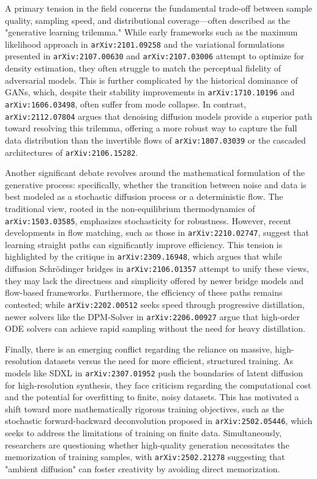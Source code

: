 \documentclass[11pt]{article}
\begin{document}
A primary tension in the field concerns the fundamental trade-off between sample quality, sampling speed, and distributional coverage—often described as the "generative learning trilemma." While early frameworks such as the maximum likelihood approach in \texttt{arXiv:2101.09258} and the variational formulations presented in \texttt{arXiv:2107.00630} and \texttt{arXiv:2107.03006} attempt to optimize for density estimation, they often struggle to match the perceptual fidelity of adversarial models. This is further complicated by the historical dominance of GANs, which, despite their stability improvements in \texttt{arXiv:1710.10196} and \texttt{arXiv:1606.03498}, often suffer from mode collapse. In contrast, \texttt{arXiv:2112.07804} argues that denoising diffusion models provide a superior path toward resolving this trilemma, offering a more robust way to capture the full data distribution than the invertible flows of \texttt{arXiv:1807.03039} or the cascaded architectures of \texttt{arXiv:2106.15282}.

Another significant debate revolves around the mathematical formulation of the generative process: specifically, whether the transition between noise and data is best modeled as a stochastic diffusion process or a deterministic flow. The traditional view, rooted in the non-equilibrium thermodynamics of \texttt{arXiv:1503.03585}, emphasizes stochasticity for robustness. However, recent developments in flow matching, such as those in \texttt{arXiv:2210.02747}, suggest that learning straight paths can significantly improve efficiency. This tension is highlighted by the critique in \texttt{arXiv:2309.16948}, which argues that while diffusion Schrödinger bridges in \texttt{arXiv:2106.01357} attempt to unify these views, they may lack the directness and simplicity offered by newer bridge models and flow-based frameworks. Furthermore, the efficiency of these paths remains contested; while \texttt{arXiv:2202.00512} seeks speed through progressive distillation, newer solvers like the DPM-Solver in \texttt{arXiv:2206.00927} argue that high-order ODE solvers can achieve rapid sampling without the need for heavy distillation.

Finally, there is an emerging conflict regarding the reliance on massive, high-resolution datasets versus the need for more efficient, structured training. As models like SDXL in \texttt{arXiv:2307.01952} push the boundaries of latent diffusion for high-resolution synthesis, they face criticism regarding the computational cost and the potential for overfitting to finite, noisy datasets. This has motivated a shift toward more mathematically rigorous training objectives, such as the stochastic forward-backward deconvolution proposed in \texttt{arXiv:2502.05446}, which seeks to address the limitations of training on finite data. Simultaneously, researchers are questioning whether high-quality generation necessitates the memorization of training samples, with \texttt{arXiv:2502.21278} suggesting that "ambient diffusion" can foster creativity by avoiding direct memorization.
\end{document}
